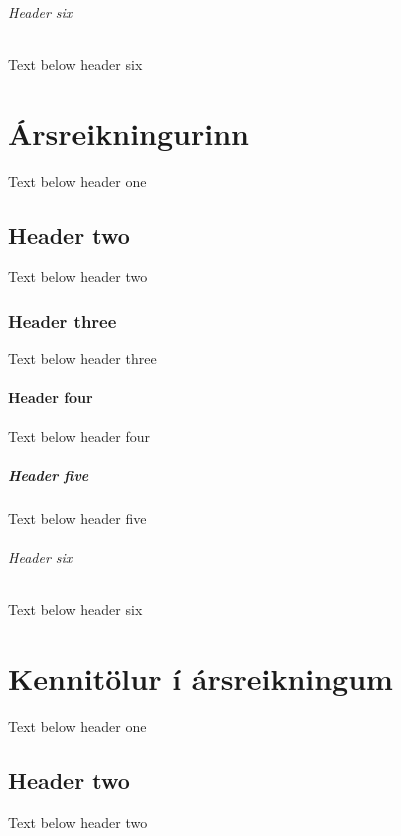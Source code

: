 \documentclass[a4paper,10pt,icelandic]{sphinxmanual}
\begin{document}
\subparagraph{Header six}
\label{\detokenize{skuldabref/index:header-six}}
\sphinxAtStartPar
Text below header six

\sphinxstepscope


\chapter{Ársreikningurinn}
\label{\detokenize{arsreikningurinn/index:arsreikningurinn}}\label{\detokenize{arsreikningurinn/index::doc}}
\sphinxAtStartPar
Text below header one


\section{Header two}
\label{\detokenize{arsreikningurinn/index:header-two}}
\sphinxAtStartPar
Text below header two


\subsection{Header three}
\label{\detokenize{arsreikningurinn/index:header-three}}
\sphinxAtStartPar
Text below header three


\subsubsection{Header four}
\label{\detokenize{arsreikningurinn/index:header-four}}
\sphinxAtStartPar
Text below header four


\paragraph{Header five}
\label{\detokenize{arsreikningurinn/index:header-five}}
\sphinxAtStartPar
Text below header five


\subparagraph{Header six}
\label{\detokenize{arsreikningurinn/index:header-six}}
\sphinxAtStartPar
Text below header six

\sphinxstepscope


\chapter{Kennitölur í ársreikningum}
\label{\detokenize{kennitolur/index:kennitolur-i-arsreikningum}}\label{\detokenize{kennitolur/index::doc}}
\sphinxAtStartPar
Text below header one


\section{Header two}
\label{\detokenize{kennitolur/index:header-two}}
\sphinxAtStartPar
Text below header two
\end{document}
